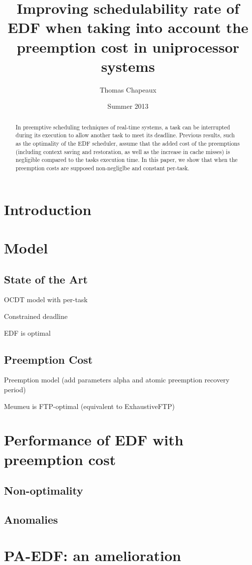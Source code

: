 \documentclass[a4paper,10pt]{article}
\title{Improving schedulability rate of EDF when taking into account the preemption cost in uniprocessor systems}
\author{Thomas Chapeaux}
\date{Summer 2013}
\begin{document}
\maketitle

\tableofcontents

\newpage

\begin{abstract}

In preemptive scheduling techniques of real-time systems, a task can be interrupted during its execution to allow another task to meet its deadline. Previous results, such as the optimality of the EDF scheduler, assume that the added cost of the preemptions (including context saving and restoration, as well as the increase in cache misses) is negligible compared to the tasks execution time. In this paper, we show that when the preemption costs are supposed non-negliglbe and constant per-task.

\end{abstract}

\newpage

\section{Introduction}

    

\section{Model}

    \subsection{State of the Art}

        OCDT model with per-task

        Constrained deadline

        EDF is optimal

    \subsection{Preemption Cost}

        Preemption model (add parameters alpha and atomic preemption recovery period)

        Meumeu is FTP-optimal (equivalent to ExhaustiveFTP)

\section{Performance of EDF with preemption cost}

    \subsection{Non-optimality}

    \subsection{Anomalies}

\section{PA-EDF: an amelioration}

\nocite{*}


\end{document}
